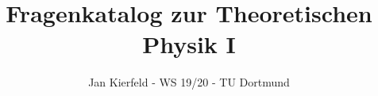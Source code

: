 

\title{Fragenkatalog zur Theoretischen Physik I}
\date{Jan Kierfeld - WS 19/20 - TU Dortmund
}



\maketitle
\thispagestyle{empty}
\newpage





